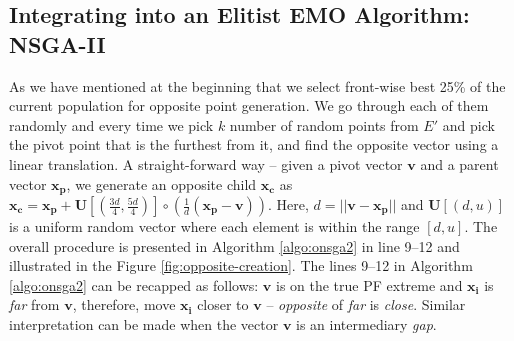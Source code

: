 \documentclass[journal]{IEEEtran}
\begin{document}
\subsection{Integrating into an Elitist EMO Algorithm: NSGA-II}
\label{sec:onsga2r}
As we have mentioned at the beginning that we select front-wise best 25\% of the current population for opposite point generation. We go through each of them randomly and every time we pick \(k\) number of random points from \(E'\) and pick the pivot point that is the furthest from it, and find the opposite vector using a linear translation. A straight-forward way -- given a pivot vector \(\mathbf{v}\) and a parent vector \(\mathbf{x_p}\), we generate an opposite child \(\mathbf{x_c}\) as \(\mathbf{x_c} = \mathbf{x_p} + \mathbf{U}[(\frac{3d}{4}, \frac{5d}{4})] \circ (\frac{1}{d}(\mathbf{x_p} - \mathbf{v}))\). Here, \(d = ||\mathbf{v} - \mathbf{x_p}||\) and \(\mathbf{U}[(d,u)]\) is a uniform random vector where each element is within the range \([d,u]\). The overall procedure is presented in Algorithm \ref{algo:onsga2} in line 9--12 and illustrated in the Figure \ref{fig:opposite-creation}. The lines 9--12 in Algorithm \ref{algo:onsga2} can be recapped as follows: \(\mathbf{v}\) is on the true PF extreme and \(\mathbf{x_i}\) is \textit{far} from \(\mathbf{v}\), therefore, move \(\mathbf{x_i}\) closer to \(\mathbf{v}\) -- \textit{opposite} of \textit{far} is \textit{close}. Similar interpretation can be made when the vector \(\mathbf{v}\) is an intermediary \textit{gap}. 
%
\end{document}
